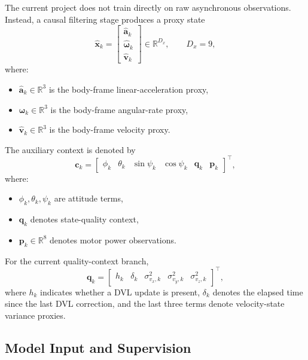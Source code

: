 The current project does not train directly on raw asynchronous observations.
Instead, a causal filtering stage produces a proxy state
\begin{equation}
\hat{\mathbf{x}}_k =
\begin{bmatrix}
\hat{\mathbf{a}}_k \\
\hat{\boldsymbol{\omega}}_k \\
\hat{\mathbf{v}}_k
\end{bmatrix}
\in \mathbb{R}^{D_x},
\qquad D_x = 9,
\end{equation}
where:
\begin{itemize}
  \item $\hat{\mathbf{a}}_k \in \mathbb{R}^{3}$ is the body-frame linear-acceleration proxy,
  \item $\hat{\boldsymbol{\omega}}_k \in \mathbb{R}^{3}$ is the body-frame angular-rate proxy,
  \item $\hat{\mathbf{v}}_k \in \mathbb{R}^{3}$ is the body-frame velocity proxy.
\end{itemize}

The auxiliary context is denoted by
\begin{equation}
\mathbf{c}_k =
\begin{bmatrix}
\phi_k &
\theta_k &
\sin\psi_k &
\cos\psi_k &
\mathbf{q}_k &
\mathbf{p}_k
\end{bmatrix}^{\top},
\end{equation}
where:
\begin{itemize}
  \item $\phi_k, \theta_k, \psi_k$ are attitude terms,
  \item $\mathbf{q}_k$ denotes state-quality context,
  \item $\mathbf{p}_k \in \mathbb{R}^{8}$ denotes motor power observations.
\end{itemize}

For the current quality-context branch,
\begin{equation}
\mathbf{q}_k =
\begin{bmatrix}
h_k &
\delta_k &
\sigma^{2}_{v_x,k} &
\sigma^{2}_{v_y,k} &
\sigma^{2}_{v_z,k}
\end{bmatrix}^{\top},
\end{equation}
where $h_k$ indicates whether a DVL update is present, $\delta_k$ denotes the elapsed time since the last DVL correction, and the last three terms denote velocity-state variance proxies.

\subsection{Model Input and Supervision}

